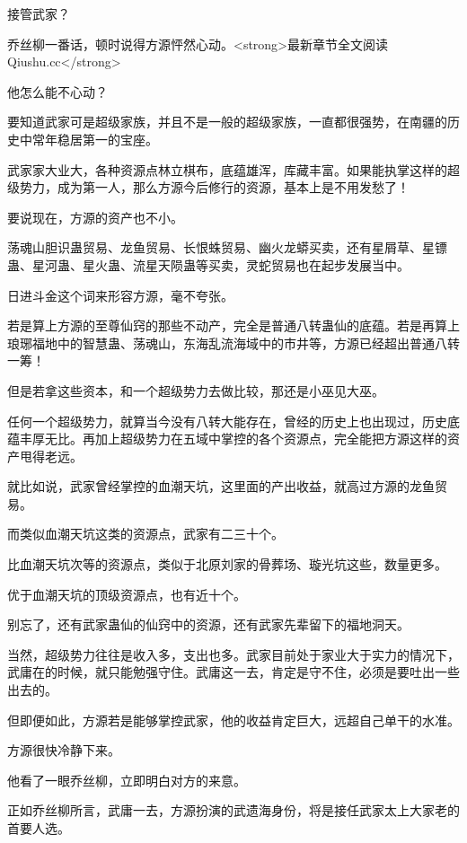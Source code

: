 
\begin{this_body}

接管武家？

乔丝柳一番话，顿时说得方源怦然心动。<strong>最新章节全文阅读Qiushu.cc</strong>

他怎么能不心动？

要知道武家可是超级家族，并且不是一般的超级家族，一直都很强势，在南疆的历史中常年稳居第一的宝座。

武家家大业大，各种资源点林立棋布，底蕴雄浑，库藏丰富。如果能执掌这样的超级势力，成为第一人，那么方源今后修行的资源，基本上是不用发愁了！

要说现在，方源的资产也不小。

荡魂山胆识蛊贸易、龙鱼贸易、长恨蛛贸易、幽火龙蟒买卖，还有星屑草、星镖蛊、星河蛊、星火蛊、流星天陨蛊等买卖，灵蛇贸易也在起步发展当中。

日进斗金这个词来形容方源，毫不夸张。

若是算上方源的至尊仙窍的那些不动产，完全是普通八转蛊仙的底蕴。若是再算上琅琊福地中的智慧蛊、荡魂山，东海乱流海域中的市井等，方源已经超出普通八转一筹！

但是若拿这些资本，和一个超级势力去做比较，那还是小巫见大巫。

任何一个超级势力，就算当今没有八转大能存在，曾经的历史上也出现过，历史底蕴丰厚无比。再加上超级势力在五域中掌控的各个资源点，完全能把方源这样的资产甩得老远。

就比如说，武家曾经掌控的血潮天坑，这里面的产出收益，就高过方源的龙鱼贸易。

而类似血潮天坑这类的资源点，武家有二三十个。

比血潮天坑次等的资源点，类似于北原刘家的骨葬场、璇光坑这些，数量更多。

优于血潮天坑的顶级资源点，也有近十个。

别忘了，还有武家蛊仙的仙窍中的资源，还有武家先辈留下的福地洞天。

当然，超级势力往往是收入多，支出也多。武家目前处于家业大于实力的情况下，武庸在的时候，就只能勉强守住。武庸这一去，肯定是守不住，必须是要吐出一些出去的。

但即便如此，方源若是能够掌控武家，他的收益肯定巨大，远超自己单干的水准。

方源很快冷静下来。

他看了一眼乔丝柳，立即明白对方的来意。

正如乔丝柳所言，武庸一去，方源扮演的武遗海身份，将是接任武家太上大家老的首要人选。


\end{this_body}
